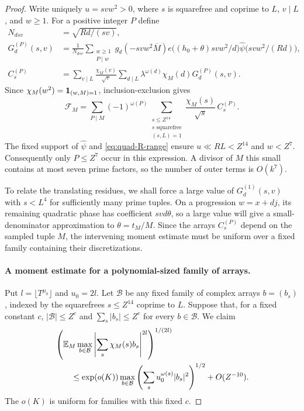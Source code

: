 \begin{proof}
Write uniquely
$u=svw^2>0$, where $s$ is squarefree and coprime to $L$, $v\mid L$,
and $w\geq1$.  For a positive integer $P$ define
\begin{equation}\label{eq:src7}
 \begin{aligned}
 N_{dsv}&=\sqrt{Rd/(sv)},\\
 G_d^{(P)}(s,v)&=\frac1{N_{dsv}}
   \sum_{\substack{w\geq1\\P\mid w}}
     g_d(-svw^2\overline M)
     e\bigl((h_0+\theta)svw^2/d\bigr)
     \widehat\psi\bigl(svw^2/(Rd)\bigr),\\
 C_s^{(P)}&=\sum_{v\mid L}\frac{\chi_M(v)}{\sqrt v}
            \sum_{d\mid L}\lambda^{\omega(d)}\chi_M(d)
                                G_d^{(P)}(s,v).
 \end{aligned}
\end{equation}
Since $\chi_M(w^2)=\mathbf 1_{(w,M)=1}$, inclusion-exclusion gives
\begin{equation}\label{eq:src8}
 \mathcal F_M=
  \sum_{P\mid M}(-1)^{\omega(P)}
    \sum_{\substack{s\leq Z^{14}\\s\text{ squarefree}\\(s,L)=1}}
       \frac{\chi_M(s)}{\sqrt s}\,C_s^{(P)}.
\end{equation}
The fixed support of $\widehat\psi$ and
\eqref{eq:quad-R-range} ensure $u\ll RL<Z^{14}$ and $w<Z^7$.
Consequently only $P\leq Z^7$ occur in this expression.  A divisor
of $M$ this small contains at most seven prime factors, so the number
of outer terms is $O(k^7)$.

To relate the translating residues, we shall force a large value of
$G_d^{(1)}(s,v)$ with $s<L^4$ for sufficiently many prime tuples.
On a progression $w=x+dj$, its remaining quadratic phase has coefficient
$svd\theta$, so a large value will give a small-denominator approximation
to $\theta=t_M/M$.  Since the arrays $C_s^{(P)}$ depend on the sampled
tuple $M$, the intervening moment estimate must be uniform over a fixed
family containing their discretizations.

\paragraph{A moment estimate for a polynomial-sized family of arrays.}
Put
$l=\lfloor T^{\mu_0}\rfloor$ and $u_0=2l$.
Let $\mathcal B$ be any fixed family of complex arrays $b=(b_s)$,
indexed by the squarefrees $s\leq Z^{14}$ coprime to $L$.
Suppose that, for a fixed constant $c$,
$|\mathcal B|\leq Z^c$ and $\sum_s|b_s|\leq Z^c$ for every
$b\in\mathcal B$.  We claim
\begin{equation}\label{eq:src9}
 \begin{aligned}
 &\left(\mathbb E_M\max_{b\in\mathcal B}
           \left|\sum_s\chi_M(s)b_s\right|^{2l}\right)^{1/(2l)}
 \\
 &\qquad\leq \exp(o(K))\max_{b\in\mathcal B}
           \left(\sum_su_0^{\omega(s)}|b_s|^2\right)^{1/2}
       +O(Z^{-10}).
 \end{aligned}
\end{equation}
The $o(K)$ is uniform for families with this fixed $c$.


\end{proof}
